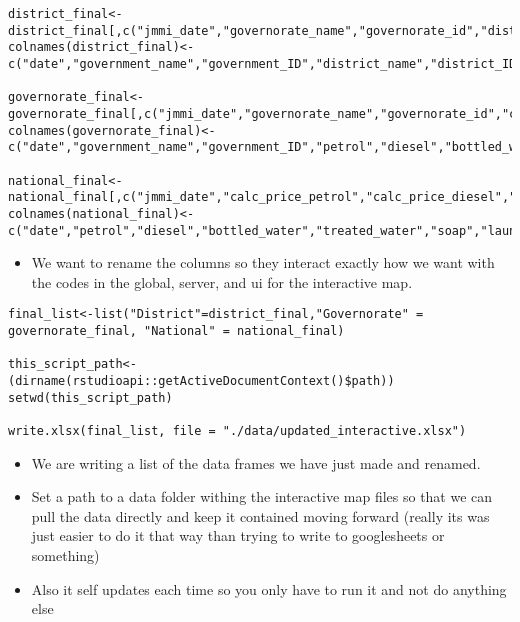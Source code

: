 \documentclass[
]{article}
\providecommand{\tightlist}{%
  \setlength{\itemsep}{0pt}\setlength{\parskip}{0pt}}
\begin{document}
\begin{verbatim}
district_final<-district_final[,c("jmmi_date","governorate_name","governorate_id","district_name","district_id","calc_price_petrol","calc_price_diesel","calc_price_bottled_water","calc_price_treated_water","calc_price_soap","calc_price_laundry","calc_price_sanitary","cost_cubic_meter","exchange_rate_result","n")]
colnames(district_final)<-c("date","government_name","government_ID","district_name","district_ID","petrol","diesel","bottled_water","treated_water","soap","laundry_powder","sanitary_napkins","cost_cubic_meter","exchange_rates","num_obs")

governorate_final<-governorate_final[,c("jmmi_date","governorate_name","governorate_id","calc_price_petrol","calc_price_diesel","calc_price_bottled_water","calc_price_treated_water","calc_price_soap","calc_price_laundry","calc_price_sanitary","cost_cubic_meter","exchange_rate_result","n")]
colnames(governorate_final)<-c("date","government_name","government_ID","petrol","diesel","bottled_water","treated_water","soap","laundry_powder","sanitary_napkins","cost_cubic_meter","exchange_rates","num_obs")

national_final<-national_final[,c("jmmi_date","calc_price_petrol","calc_price_diesel","calc_price_bottled_water","calc_price_treated_water","calc_price_soap","calc_price_laundry","calc_price_sanitary","cost_cubic_meter","exchange_rate_result","n")]
colnames(national_final)<-c("date","petrol","diesel","bottled_water","treated_water","soap","laundry_powder","sanitary_napkins","cost_cubic_meter","exchange_rates","num_obs")
\end{verbatim}

\begin{itemize}
\tightlist
\item
  We want to rename the columns so they interact exactly how we want
  with the codes in the global, server, and ui for the interactive map.
\end{itemize}

\begin{verbatim}
final_list<-list("District"=district_final,"Governorate" = governorate_final, "National" = national_final)

this_script_path<-(dirname(rstudioapi::getActiveDocumentContext()$path))
setwd(this_script_path)

write.xlsx(final_list, file = "./data/updated_interactive.xlsx")
\end{verbatim}

\begin{itemize}
\tightlist
\item
  We are writing a list of the data frames we have just made and
  renamed.
\item
  Set a path to a data folder withing the interactive map files so that
  we can pull the data directly and keep it contained moving forward
  (really its was just easier to do it that way than trying to write to
  googlesheets or something)
\item
  Also it self updates each time so you only have to run it and not do
  anything else
\end{itemize}
\end{document}
